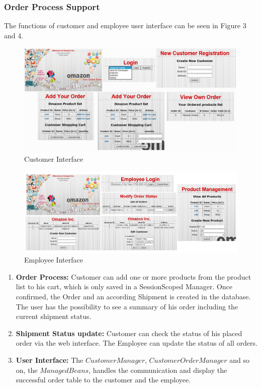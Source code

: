 \documentclass[twoside,colorbacktitle,accentcolor=tud1b]{tudexercise}
\begin{document}
\subsubsection{Order Process Support}
The functions of customer and employee user interface can be seen in Figure 3 and 4.
\begin{figure}[h!]
  \centering
   \includegraphics[width=150mm]{customer}
   \caption{Customer Interface}
\end{figure}

\begin{figure}[h!]
  \centering
   \includegraphics[width=150mm]{employee}
   \caption{Employee Interface}
\end{figure}

\begin{enumerate}\itemsep1pt \parskip0pt 
\item \textbf{Order Process:}
Customer can add one or more products from the product list to his cart, which is only saved in a SessionScoped Manager.
Once confirmed, the Order and an according Shipment is created in the database.
The user has the possibility to see a summary of his order including the current shipment status.
\item \textbf{Shipment Status update:}
Customer can check the status of his placed order via the web interface. 
The Employee can update the status of all orders.
\item \textbf{User Interface:}
The $CustomerManager$, $CustomerOrderManager$ and so on, the $ManagedBeans$, handles the communication and display the successful order table to the customer and the employee.
\end{enumerate}
\end{document}

